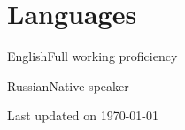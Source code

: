 \documentclass{tccv}
\newcommand{\updateinfo}[1][\today]{\par\vfill\hfill{\scriptsize\color{darkergray}Last updated on #1}}
\begin{document}
\section{Languages}

\begin{factlist}
\item{English}{Full working proficiency}
\item{Russian}{Native speaker}
\end{factlist}

\nocite{kirillova2022erqa}
\nocite{lyapustin2022towards}

\printbibliography[title={Publications}]

\updateinfo
\end{document}
